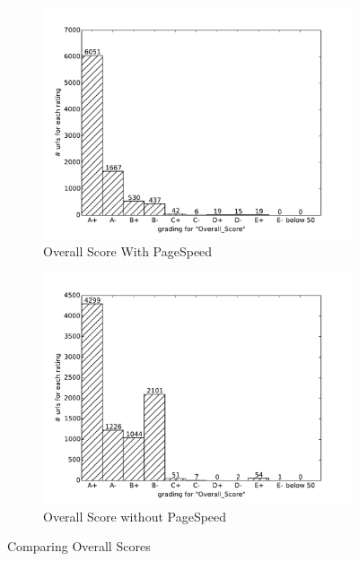 \documentclass[conference]{IEEEtran}
\begin{document}
% 

\begin{figure}
    \centering
    \begin{subfigure}[b]{\columnwidth}        %
        \centering
	\includegraphics[scale=0.40]{img/virtual-labs/container/Overall_Score.pdf}
        \caption{Overall Score With PageSpeed}
        \label{fig:overallscore-pagespeed}
    \end{subfigure}
    \hfill
    \begin{subfigure}[b]{\columnwidth}        %
        \centering
	 \includegraphics[scale=0.40]{img/virtual-labs/deploy/Overall_Score.pdf}
        \caption{Overall Score without PageSpeed}
        \label{fig:overallscore-nopagespeed}
    \end{subfigure}
    \caption{Comparing Overall Scores}
    \label{fig:overallscore-comparison}
\end{figure}
\end{document}

